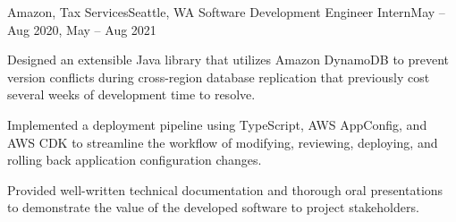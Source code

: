 \begin{ritemize}
{Amazon, Tax Services}{Seattle, WA}
{Software Development Engineer Intern}{May -- Aug 2020, May -- Aug 2021}
	\item Designed an extensible Java library that utilizes Amazon DynamoDB to prevent version conflicts during cross-region database replication that previously cost several weeks of development time to resolve.
	\item Implemented a deployment pipeline using TypeScript, AWS AppConfig, and AWS CDK to streamline the workflow of modifying, reviewing, deploying, and rolling back application configuration changes.
	\item Provided well-written technical documentation and thorough oral presentations to demonstrate the value of the developed software to project stakeholders.
\end{ritemize}